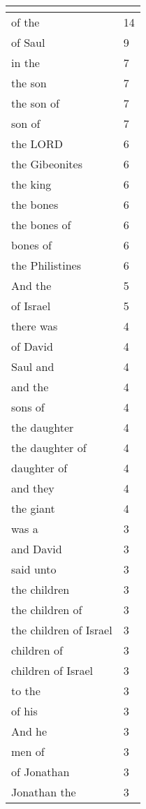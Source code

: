 \begin{center}
\begin{longtable}{|p{3.0in}|p{0.5in}|}
\hline \multicolumn{2}{c}{{ }} \\ \hline
\endfoot 
of the & 14\\ \hline 
of Saul & 9\\ \hline 
in the & 7\\ \hline 
the son & 7\\ \hline 
the son of & 7\\ \hline 
son of & 7\\ \hline 
the LORD & 6\\ \hline 
the Gibeonites & 6\\ \hline 
the king & 6\\ \hline 
the bones & 6\\ \hline 
the bones of & 6\\ \hline 
bones of & 6\\ \hline 
the Philistines & 6\\ \hline 
And the & 5\\ \hline 
of Israel & 5\\ \hline 
there was & 4\\ \hline 
of David & 4\\ \hline 
Saul and & 4\\ \hline 
and the & 4\\ \hline 
sons of & 4\\ \hline 
the daughter & 4\\ \hline 
the daughter of & 4\\ \hline 
daughter of & 4\\ \hline 
and they & 4\\ \hline 
the giant & 4\\ \hline 
was a & 3\\ \hline 
and David & 3\\ \hline 
said unto & 3\\ \hline 
the children & 3\\ \hline 
the children of & 3\\ \hline 
the children of Israel & 3\\ \hline 
children of & 3\\ \hline 
children of Israel & 3\\ \hline 
to the & 3\\ \hline 
of his & 3\\ \hline 
And he & 3\\ \hline 
men of & 3\\ \hline 
of Jonathan & 3\\ \hline 
Jonathan the & 3\\ \hline 

\end{longtable}
\end{center}
